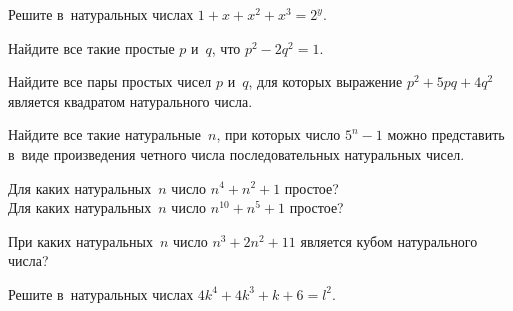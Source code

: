 


\begin{problems}

\item
Решите в~натуральных числах $1 + x + x^2 + x^3 = 2^y$.

\item
Найдите все такие простые $p$ и~$q$, что $p^2 - 2 q ^2 = 1$.

\item
Найдите все пары простых чисел $p$ и~$q$, для которых
выражение $p^2 + 5 p q + 4 q^2$ является квадратом натурального числа.

\item
Найдите все такие натуральные~$n$, при которых число $5^{n} - 1$ можно
представить в~виде произведения четного числа последовательных натуральных
чисел.

\item
\subproblem
Для каких натуральных~$n$ число $n^4 + n^2 + 1$ простое?
\\
\subproblem
Для каких натуральных~$n$ число $n^{10} + n^5 + 1$ простое?

\item
При каких натуральных~$n$ число $n^3 + 2 n^2 + 11$ является кубом натурального
числа?

\item
Решите в~натуральных числах $4 k^4 + 4 k^3 + k + 6 = l^2$.

\end{problems}


